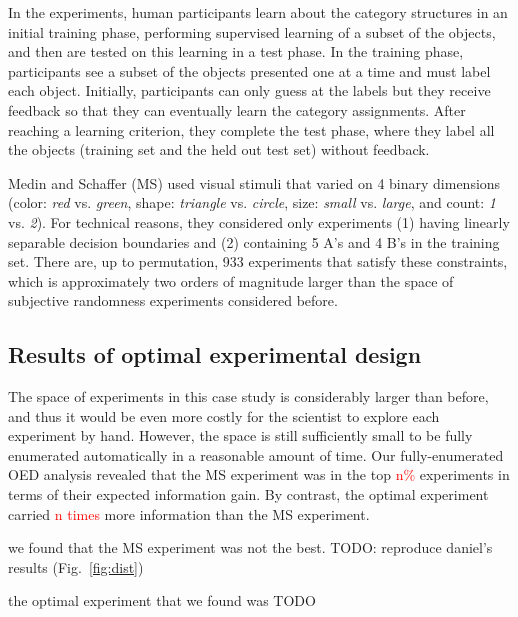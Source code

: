 \documentclass{article}
\newcommand{\red}[1]{\textcolor{Red}{#1}}
\newcommand{\cas}[1]{ \textsf{\color{darkgray} \scriptsize #1} }
\begin{document}
In the experiments, human participants learn about the category structures in an initial training phase, performing supervised learning of a subset of the objects, and then are tested on this learning in a test phase.
In the training phase, participants see a subset of the objects presented one at a time and must label each object.
Initially, participants can only guess at the labels but they receive feedback so that they can eventually learn the category assignments.
After reaching a learning criterion, they complete the test phase, where they label all the objects (training set and the held out test set) without feedback.

Medin and Schaffer (MS) used visual stimuli that varied on 4 binary dimensions (color: \emph{red} vs. \emph{green}, shape: \emph{triangle} vs. \emph{circle}, size: \emph{small} vs. \emph{large}, and count: \emph{1} vs. \emph{2}).
For technical reasons, they considered only experiments (1) having linearly separable decision boundaries and (2) containing 5 A's and 4 B's in the training set.
There are, up to permutation, 933 experiments that satisfy these constraints, which is approximately two orders of magnitude larger than the space of subjective randomness experiments considered before.




\subsection{Results of optimal experimental design}

The space of experiments in this case study is considerably larger than before, and thus it would be even more costly for the scientist to explore each experiment by hand. However, the space is still sufficiently small to be fully enumerated automatically in a reasonable amount of time.
Our fully-enumerated OED analysis revealed that the MS experiment was in the top \red{n\%} experiments in terms of their expected information gain.
By contrast, the optimal experiment carried \red{n times} more information than the MS experiment.


\cas{we found that the MS experiment was not the best. TODO: reproduce daniel's results (Fig.~\ref{fig:dist})}

\cas{the optimal experiment that we found was TODO}
\end{document}
